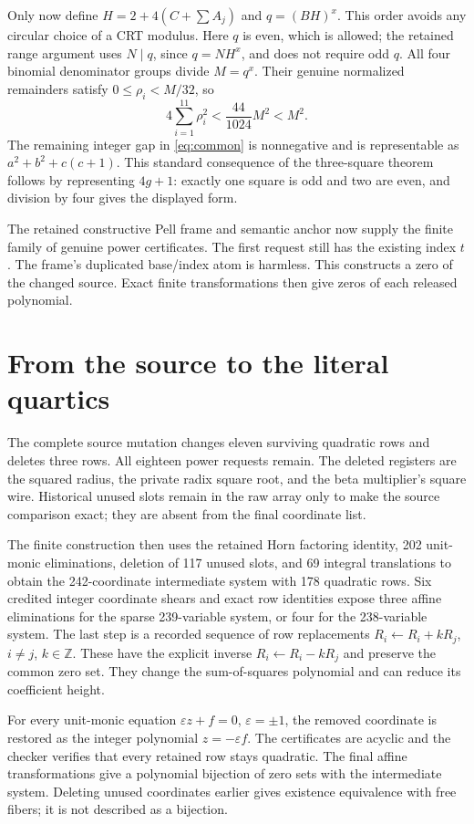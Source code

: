 \documentclass[11pt]{article}
\begin{document}
Only now define $H=2+4(C+\sum A_j)$ and $q=(BH)^x$. This order avoids
any circular choice of a CRT modulus. Here $q$ is even, which is allowed;
the retained range argument uses $N\mid q$, since $q=NH^x$, and does
not require odd $q$. All four binomial denominator groups divide $M=q^x$.
Their genuine normalized remainders satisfy $0\le\rho_i<M/32$, so
\[
 4\sum_{i=1}^{11}\rho_i^2<\frac{44}{1024}M^2<M^2.
\]
The remaining integer gap in \eqref{eq:common} is nonnegative and is
representable as $a^2+b^2+c(c+1)$. This standard consequence of the
three-square theorem follows by representing $4g+1$: exactly one square
is odd and two are even, and division by four gives the displayed form.

The retained constructive Pell frame and semantic anchor now supply the
finite family of genuine power certificates. The first request still has
the existing index $t$. The frame's duplicated base/index atom is harmless.
This constructs a zero of the changed source. Exact finite transformations
then give zeros of each released polynomial.

\section{From the source to the literal quartics}\label{sec:finite}

The complete source mutation changes eleven surviving quadratic rows and
deletes three rows. All eighteen power requests remain. The deleted
registers are the squared radius, the private radix square root, and the
beta multiplier's square wire. Historical unused slots remain in the raw
array only to make the source comparison exact; they are absent from the
final coordinate list.

The finite construction then uses the retained Horn factoring identity,
202 unit-monic eliminations, deletion of 117 unused slots, and 69 integral
translations to obtain the 242-coordinate intermediate system with
178 quadratic rows. Six credited integer coordinate shears and exact row
identities expose three affine eliminations for the sparse 239-variable
system, or four for the 238-variable system. The last step is a recorded
sequence of row replacements $R_i\leftarrow R_i+kR_j$, $i\ne j$,
$k\in\mathbb Z$. These have the explicit inverse
$R_i\leftarrow R_i-kR_j$ and preserve the common zero set. They change
the sum-of-squares polynomial and can reduce its coefficient height.

For every unit-monic equation $\varepsilon z+f=0$, $\varepsilon=\pm1$,
the removed coordinate is restored as the integer polynomial
$z=-\varepsilon f$. The certificates are acyclic and the checker verifies
that every retained row stays quadratic. The final affine transformations
give a polynomial bijection of zero sets with the intermediate system.
Deleting unused coordinates earlier gives existence equivalence with free
fibers; it is not described as a bijection.
\end{document}
